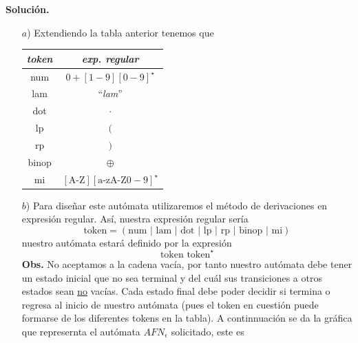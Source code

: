 \textbf{Solución.}
\begin{itemize}
\item[$a$)] Extendiendo la tabla anterior tenemos que \newline
  \begin{center}
    \begin{tabular}{ c | c }
      \textit{token} & \textit{exp. regular} \\ \hline
      num            & $0 + [1-9][0-9]^{\star}$ \\
      lam            & ``\textit{lam}'' \\
      dot            & $\cdot$\\
      lp             & $($ \\
      rp             & $)$ \\
      binop          & $\oplus$ \\
      mi             & $[\text{A-Z}][\text{a-zA-Z}0-9]^{\star}$ \\ \hline
    \end{tabular}
  \end{center}
\item[$b$)] Para diseñar este autómata utilizaremos el método de derivaciones en expresión regular.
  Así, nuestra expresión regular sería
  \[ \text{token} = \left(\text{num } | \text{ lam } | \text{ dot } | \text{ lp } | \text{ rp } |
  \text{ binop } | \text{ mi}\right)\]
  nuestro autómata estará definido por la expresión 
  \[\text{token }\text{token}^{\star}\]
  \textbf{Obs.} No aceptamos a la cadena vacía, por tanto nuestro autómata debe tener un estado inicial
  que no sea terminal y del cuál sus transiciones a otros estados sean \underline{no} vacías. Cada estado
  final debe poder decidir si termina o regresa al inicio de nuestro autómata (pues el token en cuestión
  puede formarse de los diferentes tokens en la tabla).
  \newpage
  A continnuación se da la gráfica que represernta el autómata $AFN_{\epsilon}$ solicitado,
  este es
  \begin{center}
\end{center}
\end{itemize}
